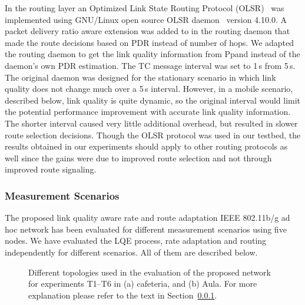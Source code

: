 \documentclass[11pt,draftclsnofoot,journal,onecolumn]{IEEEtran}
\begin{document}
In the routing layer an Optimized Link State Routing Protocol (OLSR)~\cite{RFC_OLSR} was implemented using GNU/Linux open source OLSR daemon~\cite{Olsrd} version 4.10.0. A packet delivery ratio aware extension was added to in the routing daemon that made the route decisions based on PDR instead of number of hops. We adapted the routing daemon to get the link quality information from Ppand instead of the daemon's own PDR estimation. The TC message interval was set to 1\,s from 5\,s. The original daemon was designed for the stationary scenario in which link quality does not change much over a 5\,s interval. However, in a mobile scenario, described below, link quality is quite dynamic, so the original interval would limit the potential performance improvement with accurate link quality information. The shorter interval caused very little additional overhead, but resulted in slower route selection decisions. Though the OLSR protocol was used in our testbed, the results obtained in our experiments should apply to other routing protocols as well since the gains were due to improved route selection and not through improved route signaling.

\subsubsection{Measurement Scenarios}
\label{sec:indoor topology}

The proposed link quality aware rate and route adaptation IEEE 802.11b/g ad hoc network has been evaluated for different measurement scenarios using five nodes. We have evaluated the LQE process, rate adaptation and routing independently for different scenarios. All of them are described below.
\begin{figure}
\centering
{}
\caption{Different topologies used in the evaluation of the proposed network for experiments T1--T6 in (a) cafeteria, and (b) Aula. For more explanation please refer to the text in Section~\ref{sec:indoor topology}.}
\label{fig:topology_indoor}
\end{figure}
\end{document}
